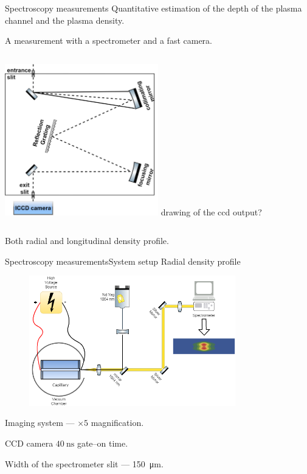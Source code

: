 \documentclass[draft]{beamer}
\begin{document}
  \begin{frame}{Spectroscopy measurements}
    Quantitative estimation of the depth of the plasma channel and the plasma density.

    A measurement with a spectrometer and a fast camera.
    \begin{columns}
          \includegraphics[width=0.5\textwidth]{figures/results/spectro/spectrometer.png}
      drawing of the ccd output?
    \end{columns}
    Both radial and longitudinal density profile.
  \end{frame}
  \begin{frame}{Spectroscopy measurements}{System setup}
Radial density profile
\begin{figure}
  \includegraphics[width=0.8\textwidth]{figures/results/spectro/radial_system.png}
\end{figure}
Imaging system --- $\times 5$ magnification.

CCD camera $\SI{40}{\ns}$ gate--on time. 

Width of the spectrometer slit --- \SI{150}{\um}.
  \end{frame}
\end{document}
